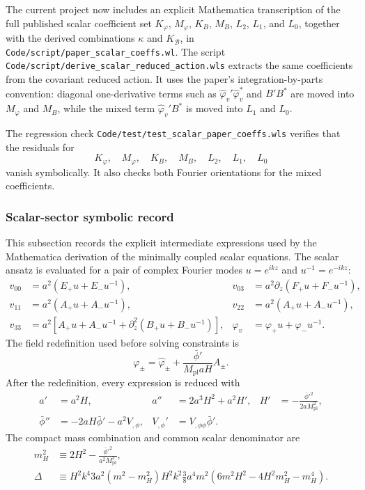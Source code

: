 \documentclass[11pt]{article}
\newcommand{\Mpl}{M_{\mathrm{pl}}}
\begin{document}
The current project now includes an explicit Mathematica transcription of the full published scalar coefficient set $K_\varphi$, $M_\varphi$, $K_B$, $M_B$, $L_2$, $L_1$, and $L_0$, together with the derived combinations $\kappa$ and $K_\mathcal{B}$, in \texttt{Code/script/paper\_scalar\_coeffs.wl}. The script \texttt{Code/script/derive\_scalar\_reduced\_action.wls} extracts the same coefficients from the covariant reduced action. It uses the paper's integration-by-parts convention: diagonal one-derivative terms such as $\hat\varphi_v'\hat\varphi_v^\ast$ and $B'B^\ast$ are moved into $M_\varphi$ and $M_B$, while the mixed term $\hat\varphi_v'B^\ast$ is moved into $L_1$ and $L_0$.

The regression check \texttt{Code/test/test\_scalar\_paper\_coeffs.wls} verifies that the residuals for
\begin{equation}
K_\varphi,\quad M_\varphi,\quad K_B,\quad M_B,\quad L_2,\quad L_1,\quad L_0
\end{equation}
vanish symbolically. It also checks both Fourier orientations for the mixed coefficients.

\subsubsection{Scalar-sector symbolic record}
This subsection records the explicit intermediate expressions used by the Mathematica derivation of the minimally coupled scalar equations. The scalar ansatz is evaluated for a pair of complex Fourier modes $u=e^{ikz}$ and $u^{-1}=e^{-ikz}$:
\begin{align}
v_{00} &= a^2 (E_+u+E_-u^{-1}), &
v_{03} &= a^2 \partial_z(F_+u+F_-u^{-1}), \\
v_{11} &= a^2 (A_+u+A_-u^{-1}), &
v_{22} &= a^2 (A_+u+A_-u^{-1}), \\
v_{33} &= a^2 \left[A_+u+A_-u^{-1}+\partial_z^2(B_+u+B_-u^{-1})\right], &
\varphi_v &= \varphi_+u+\varphi_-u^{-1}.
\end{align}
The field redefinition used before solving constraints is
\begin{equation}
\varphi_\pm = \hat\varphi_\pm + \frac{\bar\phi'}{\Mpl aH} A_\pm .
\end{equation}
After the redefinition, every expression is reduced with
\begin{align}
a' &= a^2H, &
a'' &= 2a^3H^2+a^2H', &
H' &= -\frac{\bar\phi'^2}{2a\Mpl^2}, \\
\bar\phi'' &= -2aH\bar\phi' - a^2V_{,\phi}, &
V_{,\phi}' &= V_{,\phi\phi}\bar\phi'.
\end{align}
The compact mass combination and common scalar denominator are
\begin{align}
m_H^2 &\equiv 2H^2-\frac{\bar\phi'^2}{a^2\Mpl^2}, \\
\Delta &\equiv H^2k^4
3a^2(m^2-m_H^2)H^2k^2
\frac{3}{8}a^4m^2\left(6m^2H^2-4H^2m_H^2-m_H^4\right).
\end{align}
\end{document}
